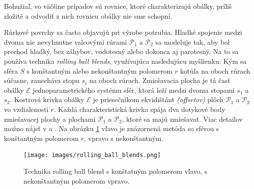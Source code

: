 Bohužiaľ, vo väčšine prípadov sú rovnice, ktoré charakterizujú obálky, príliš zložité a odvodiť z nich rovnicu obálky nie sme schopní.

Rúrkové povrchy sa často objavujú pri výrobe potrubia. Hladké spojenie medzi dvoma nie nevyhnutne valcovými rúrami $\mathcal{P}_1$ a $\mathcal{P}_2$ sa modeluje tak, aby bol prechod hladký, bez záhybov, vodotesný alebo dokonca aj parotesný. Na to sa používa technika \textit{rolling ball blends}, využívajúca nasledujúcu myšlienku: Kým sa sféra $S$ s konštantným alebo nekonštantným polomerom $r$ kotúľa na oboch rúrach súčasne, zanecháva stopu $s_i$ na oboch rúrach. Zmiešavacia plocha je tá časť obálky $\mathcal{E}$ jednoparametrického systému sfér, ktorá leží medzi dvoma stopami $s_1$ a $s_2$. Kostrová krivka obálky $\mathcal{E}$ je priesečníkom ekvidištánt \textit{(offsetov)} plôch $\mathcal{P}_1$ a $\mathcal{P}_2$ vo vzdialenosti $r$. Každá charakteristická krivka spája dva dotykové body zmiešavacej plochy a plochami $\mathcal{P}_1$ a $\mathcal{P}_2$, ktoré sa majú zmiešavať. Viac detailov možno nájsť v \cite{Kar00} a \cite{Ode20}. Na obrázku \ref{fig:rolling_ball_blends} vľavo je znázornená metóda so sférou s konštantným polomerom $r$, vpravo s nekonštantným.

\begin{figure}[h]
	\centering
	\texttt{[image: images/rolling\_ball\_blends.png]}
	\caption[Technika rolling ball blends.]{Technika rolling ball blend s konštatným polomerom vľavo, s nekonštantným polomerom vpravo. \cite{Rollingballblends}}
	\label{fig:rolling_ball_blends}
\end{figure}